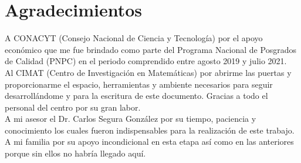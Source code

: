 \chapter*{Agradecimientos}
A CONACYT (Consejo Nacional de Ciencia y Tecnología) por el apoyo económico que me fue brindado como parte del Programa Nacional de Posgrados de Calidad (PNPC) en el periodo comprendido entre agosto 2019 y julio 2021.\\

Al CIMAT (Centro de Investigación en Matemáticas) por abrirme las puertas y proporcionarme el espacio, herramientas y ambiente necesarios para seguir desarrollándome y para la escritura de este documento. Gracias a todo el personal del centro por su gran labor.\\

A mi asesor el Dr. Carlos Segura González por su tiempo, paciencia y conocimiento los cuales fueron indispensables para la realización de este trabajo.\\

A mi familia por su apoyo incondicional en esta etapa así como en las anteriores porque sin ellos no habría llegado aquí.\\

